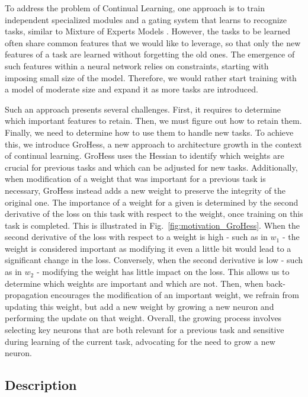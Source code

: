 \documentclass[11pt]{article}
\begin{document}
To address the problem of Continual Learning, one approach is to train independent specialized modules and a gating system that learns to recognize tasks, similar to Mixture of Experts Models \cite{moe_1}\cite{moe_2}. However, the tasks to be learned often share common features that we would like to leverage, so that only the new features of a task are learned without forgetting the old ones. The emergence of such features within a neural network relies on constraints, starting with imposing small size of the model. Therefore, we would rather start training with a model of moderate size and expand it as more tasks are introduced.

\vspace{2mm}
\noindent
Such an approach presents several challenges. First, it requires to determine which important features to retain. Then, we must figure out how to retain them. Finally, we need to determine how to use them to handle new tasks. To achieve this, we introduce GroHess, a new approach to architecture growth in the context of continual learning. GroHess uses the Hessian to identify which weights are crucial for previous tasks and which can be adjusted for new tasks. Additionally, when modification of a weight that was important for a previous task is necessary, GroHess instead adds a new weight to preserve the integrity of the original one. The importance of a weight for a given is determined by the second derivative of the loss on this task with respect to the weight, once training on this task is completed. This is illustrated in Fig.~\ref{fig:motivation_GroHess}. When the second derivative of the loss with respect to a weight is high - such as in $w_1$ - the weight is considered important as modifying it even a little bit would lead to a significant change in the loss. Conversely, when the second derivative is low - such as in $w_2$ - modifying the weight has little impact on the loss. This allows us to determine which weights are important and which are not. Then, when back-propagation encourages the modification of an important weight, we refrain from updating this weight, but add a new weight by growing a new neuron and performing the update on that weight. Overall, the growing process involves selecting key neurons that are both relevant for a previous task and sensitive during learning of the current task, advocating for the need to grow a new neuron.


\subsection{Description}
\end{document}
